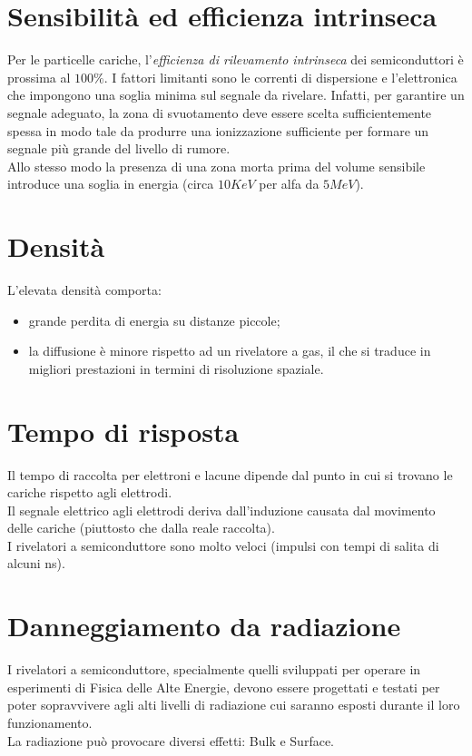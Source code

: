 \documentclass[12pt, letterpaper]{book}
\begin{document}
\section{Sensibilità ed efficienza intrinseca}
Per le particelle cariche, l'\textit{efficienza di rilevamento intrinseca} dei semiconduttori è prossima al $100\%$. I fattori limitanti sono le correnti di dispersione e l'elettronica che impongono una soglia minima sul segnale da rivelare. Infatti, per garantire un segnale adeguato, la zona di svuotamento deve essere scelta sufficientemente spessa in modo tale da produrre una ionizzazione sufficiente per formare un segnale più grande del livello di rumore.\\
Allo stesso modo la presenza di una zona morta prima del volume sensibile introduce una soglia in energia (circa $10 KeV$ per alfa da $5 MeV$).

\newpage
\section{Densità}
L'elevata densità comporta:
\begin{itemize}
    \item grande perdita di energia su distanze piccole;
    \item la diffusione è minore rispetto ad un rivelatore a gas, il che si traduce in migliori prestazioni in termini di risoluzione spaziale.
\end{itemize}

\section{Tempo di risposta}
Il tempo di raccolta per elettroni e lacune dipende dal punto in cui si trovano le cariche rispetto agli elettrodi.\\
Il segnale elettrico agli elettrodi deriva dall’induzione causata dal movimento delle cariche (piuttosto che dalla reale raccolta).\\
I rivelatori a semiconduttore sono molto veloci (impulsi con tempi di salita di alcuni ns).

\section{Danneggiamento da radiazione}
I rivelatori a semiconduttore, specialmente quelli sviluppati per operare in esperimenti di Fisica delle Alte Energie, devono essere progettati e testati per poter sopravvivere agli alti livelli di radiazione cui saranno esposti durante il loro funzionamento.\\
La radiazione può provocare diversi effetti: Bulk e Surface.
\end{document}
